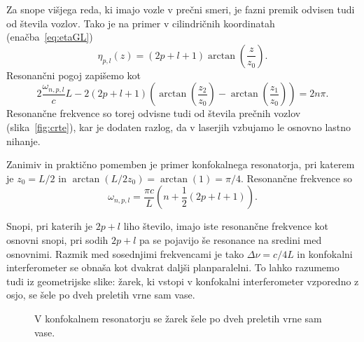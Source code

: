 Za snope višjega reda, ki imajo vozle v prečni smeri, je fazni premik
odvisen tudi od števila vozlov. Tako je na primer v cilindričnih koordinatah
(enačba~\ref{eq:etaGL})
\begin{equation}
\eta_{p,l}(z)=(2p+l+1)\arctan\left(\frac{z}{z_{0}}\right).
\end{equation}
Resonančni pogoj zapišemo kot
\begin{equation}
2\frac{\omega_{n,p,l}}{c}L-2(2p+l+1)\left(\arctan\left(\frac{z_{2}}{z_{0}}\right)-
\arctan\left(\frac{z_{1}}{z_{0}}\right)\right)=2n\pi.
\end{equation}
Resonančne frekvence so torej odvisne tudi od števila prečnih vozlov (slika~\ref{fig:crte}),
kar je dodaten razlog, da v laserjih vzbujamo le osnovno lastno nihanje.

Zanimiv in praktično pomemben je primer konfokalnega resonatorja,
pri katerem je $z_{0}=L/2$ in $\arctan(L/2z_{0})= \arctan(1)=\pi/4$. Resonančne frekvence
so 
\begin{equation}
\omega_{n,p,l}=\frac{\pi c}{L}\left(n+\frac{1}{2}(2p+l+1)\right).
\label{eq:omega_konf}
\end{equation}

Snopi, pri katerih je $2p+l$ liho število, imajo iste resonančne frekvence kot
osnovni snopi, pri sodih $2p+l$ pa se pojavijo še resonance na sredini
med osnovnimi. Razmik med so\-sed\-nji\-mi frekvencami je tako $\Delta\nu=c/4L$
in konfokalni interferometer se obnaša kot dvakrat daljši planparalelni.
To lahko razumemo tudi iz geometrijske slike: žarek, ki vstopi v konfokalni
interferometer vzporedno z osjo, se šele po dveh preletih vrne sam
vase.

\begin{figure}[h]
\centering
\def\svgwidth{55truemm} 

\caption{V konfokalnem resonatorju se žarek šele po dveh preletih
vrne sam vase.}
\label{fig:Konfokalni_zarek}
\end{figure}


